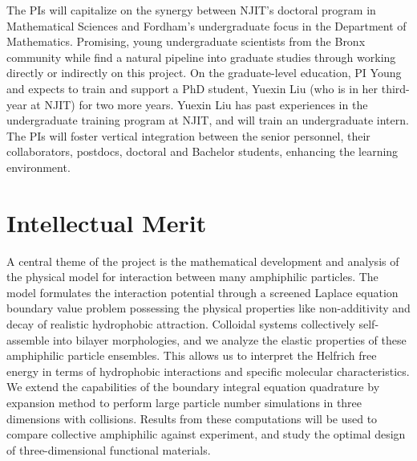 The PIs will capitalize on the synergy between NJIT's doctoral program
in Mathematical Sciences and Fordham's undergraduate focus in the
Department of Mathematics. Promising, young undergraduate scientists
from the Bronx community while find a natural pipeline into graduate
studies through working directly or indirectly on this project. On the
graduate-level education, PI Young and expects to train and
support a PhD student, Yuexin Liu (who is in her third-year at NJIT) for
two more years. Yuexin Liu has past experiences in the undergraduate
training program at NJIT, and will train an undergraduate intern. The
PIs will foster vertical integration between the senior personnel, their
collaborators, postdocs, doctoral and Bachelor students, enhancing the
learning environment.
%


%
%

\section{Intellectual Merit}
A central theme of the project is the mathematical development and
analysis of the physical model for interaction between many amphiphilic
particles. The model formulates the interaction potential through a
screened Laplace equation boundary value problem possessing the physical
properties like non-additivity and decay of realistic hydrophobic
attraction. Colloidal systems collectively self-assemble into bilayer
morphologies, and we analyze the elastic properties of these amphiphilic
particle ensembles. This allows us to interpret the Helfrich free
energy in terms of hydrophobic interactions and specific molecular
characteristics. We extend the capabilities of the boundary integral
equation quadrature by expansion method to perform large particle number
simulations in three dimensions with collisions. Results from these
computations will be used to compare collective amphiphilic against
experiment, and study the optimal design of three-dimensional
functional materials. 



